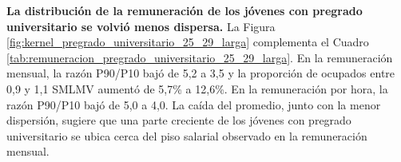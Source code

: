 \textbf{La distribución de la remuneración de los jóvenes con pregrado universitario se volvió menos dispersa.} La Figura \ref{fig:kernel_pregrado_universitario_25_29_larga} complementa el Cuadro \ref{tab:remuneracion_pregrado_universitario_25_29_larga}. En la remuneración mensual, la razón P90/P10 bajó de 5,2 a 3,5 y la proporción de ocupados entre 0,9 y 1,1 SMLMV aumentó de 5,7\% a 12,6\%. En la remuneración por hora, la razón P90/P10 bajó de 5,0 a 4,0. La caída del promedio, junto con la menor dispersión, sugiere que una parte creciente de los jóvenes con pregrado universitario se ubica cerca del piso salarial observado en la remuneración mensual.




